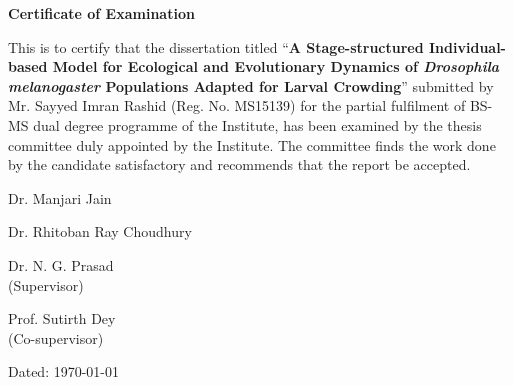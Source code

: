\cleardoublepage
\begin{center}
\Large  {\bf Certificate of Examination}
\end{center}
\vspace{1in}
This is to certify that the dissertation titled “\textbf{A Stage-structured Individual-based Model for Ecological and Evolutionary Dynamics of \textit{Drosophila melanogaster} Populations Adapted for Larval Crowding}” submitted by Mr. Sayyed Imran Rashid (Reg. No. MS15139) for the partial fulfilment of BS-MS dual degree programme of the Institute, has been examined by the thesis committee duly appointed by the Institute. The committee finds the work done by the candidate satisfactory and recommends that the report be accepted.

\vspace{1in}
\begin{center}
\parbox[t]{0.24\textwidth}{
    \centering
    Dr. Manjari Jain}
\parbox[t]{0.24\textwidth}{
    \centering
    Dr. Rhitoban Ray Choudhury}
\parbox[t]{0.24\textwidth}{
    \centering
    Dr. N. G. Prasad\\
    (Supervisor)}
\parbox[t]{0.24\textwidth}{
    \centering
    Prof. Sutirth Dey\\
    (Co-supervisor)}
\end{center}
\vspace{0.5in}
\begin{flushright}
Dated: \today
\end{flushright}
\vfill
\pagebreak
